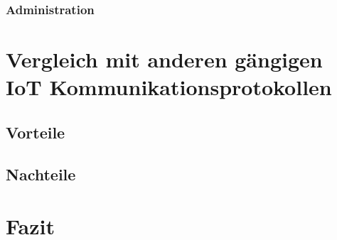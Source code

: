 \subsubsection{Administration}
\label{sss:interface:connect:admin}

\section{Vergleich mit anderen gängigen IoT Kommunikationsprotokollen}
\label{s:vergleich} 

\subsection{Vorteile}
\label{ss:vergleich:adv}

\subsection{Nachteile}
\label{ss:vergleich:disadv}

\section{Fazit}
\label{s:fazit}

  
